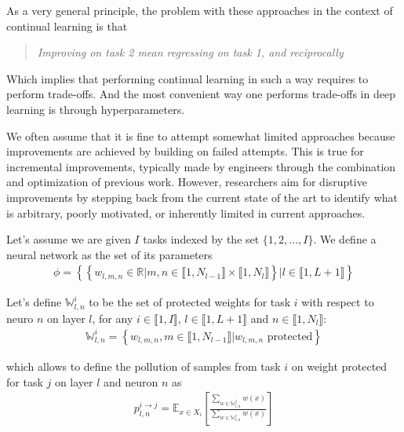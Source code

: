 \documentclass{article}
\newcommand{\intset}[2]{\llbracket #1, #2 \rrbracket}
\begin{document}
As a very general principle, the problem with these approaches in the context of continual learning is that
\begin{quote}
    \itshape
    \centering
    Improving on task 2 mean regressing on task 1, and reciprocally
\end{quote}

\noindent
Which implies that performing continual learning in such a way requires to perform trade-offs. And the most convenient way one performs trade-offs in deep learning is through hyperparameters.

\vspace{0.5cm}

\noindent
We often assume that it is fine to attempt somewhat limited approaches because improvements are achieved by building on failed attempts. This is true for incremental improvements, typically made by engineers through the combination and optimization of previous work. However, researchers aim for disruptive improvements by stepping back from the current state of the art to identify what is arbitrary, poorly motivated, or inherently limited in current approaches.

\vspace{0.5cm}


\noindent
Let's assume we are given $I$ tasks indexed by the set $\{1,2,...,I\}$. We define a neural network as the set of its parameters
\begin{align}
    \phi = \left\{\left\{ w_{l,m,n} \in \mathbb{R} | m,n \in \llbracket 1, N_{l-1} \rrbracket \times \llbracket 1, N_{l} \rrbracket \right\} | l \in \llbracket 1, L+1 \rrbracket \right\}
\end{align}

\noindent
Let's define $\mathbb{W}_{l,n}^i$ to be the set of protected weights for task $i$ with respect to neuro $n$ on layer $l$, for any $i \in \intset{1}{I}$, $l \in \intset{1}{L+1}$ and $n \in \intset{1}{N_l}$:
\begin{align}
    \mathbb{W}_{l,n}^i = \left\{ w_{l,m,n}, m \in \intset{1}{N_{l-1}} | w_{l,m,n} \text{ protected} \right\}
\end{align}

\noindent
which allows to define the pollution of samples from task $i$ on weight protected for task $j$ on layer $l$ and neuron $n$ as
\begin{align}
    p_{l,n}^{i\rightarrow j} = \mathbb{E}_{x\in X_i}\left[\frac{\sum_{w \in \mathbb{W}_{l,n}^j}{w(x)}}{\sum_{w \in \mathbb{W}_{l,n}^i}{w(x)}}\right]
\end{align}
\end{document}
